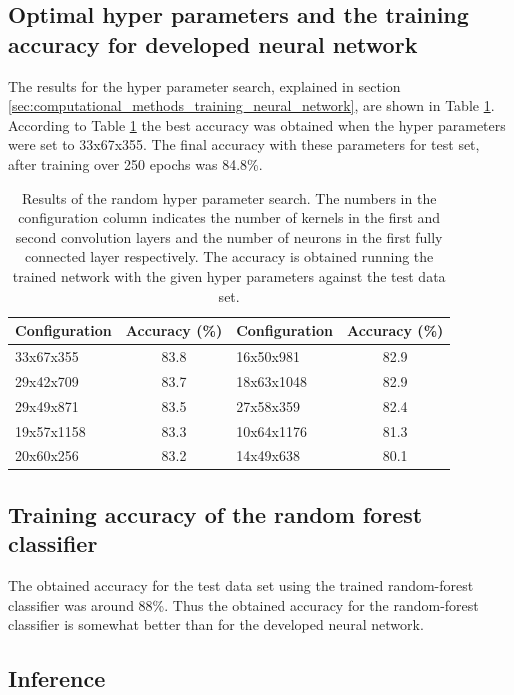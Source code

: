 \documentclass[aps,prb,10pt,twocolumn,groupedaddress]{revtex4-1}
\begin{document}
\subsection{Optimal hyper parameters and the training accuracy for developed neural network}
\label{sec:results_training}
The results for the hyper parameter search, explained in section \ref{sec:computational_methods_training_neural_network}, are shown in Table \ref{tab:hyperparameter_searach_accuracies}. According to Table \ref{tab:hyperparameter_searach_accuracies} the best accuracy was obtained when the hyper parameters were set to 33x67x355. The final accuracy with these parameters for test set, after training over 250 epochs was 84.8\%.
\begin{center}
	\begin{table}[h]
		\begin{tabular*}{0.45\textwidth}{lclc}
			Configuration & Accuracy (\%) & Configuration & Accuracy (\%)\\
			\hline
			33x67x355 & 83.8 & 16x50x981 & 82.9\\
			29x42x709 & 83.7 & 18x63x1048 & 82.9\\
			29x49x871 & 83.5 & 27x58x359 & 82.4\\
			19x57x1158 & 83.3 & 10x64x1176 & 81.3\\
			20x60x256 & 83.2 & 14x49x638 & 80.1\\
		\end{tabular*}
		\caption{Results of the random hyper parameter search. The numbers in the configuration column indicates the number of kernels in the first and second convolution layers and the number of neurons in the first fully connected layer respectively. The accuracy is obtained running the trained network with the given hyper parameters against the test data set.}
		\label{tab:hyperparameter_searach_accuracies}
	\end{table}
\end{center}

\subsection{Training accuracy of the random forest classifier}
\label{sec:results_random_forest_training}
The obtained accuracy for the test data set using the trained random-forest classifier was around 88\%. Thus the obtained accuracy for the random-forest classifier is somewhat better than for the developed neural network.

\subsection{Inference}
\label{sec:results_inference}
\end{document}
